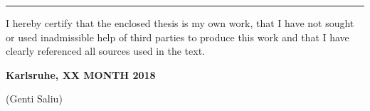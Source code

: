 \vspace*{\fill}

\rule{1.0\textwidth}{0.6pt}

\vspace*{0.75em}

I hereby certify that the enclosed thesis is my own work, that I have not sought or used inadmissible help of third parties to produce this work and that I have clearly referenced all sources used in the text.

\vspace*{0.75em}

\textbf{Karlsruhe, XX MONTH 2018}

\vspace*{4em}

\dotfill \hspace*{8cm} 

\hspace*{1.79cm}(Genti Saliu)
